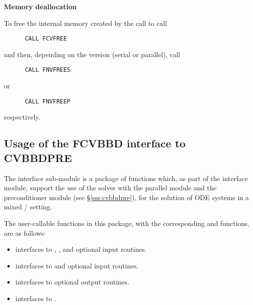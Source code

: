 \begin{Steps}
\item {\bf Memory deallocation}

  To free the internal memory created by the call to  call
\begin{verbatim}
      CALL FCVFREE
\end{verbatim}
  and then, depending on the {\nvector} version (serial or parallel), call
\begin{verbatim}
      CALL FNVFREES
\end{verbatim}
  or
\begin{verbatim}
      CALL FNVFREEP  
\end{verbatim}
  respectively.

\end{Steps}

\subsection{Usage of the FCVBBD interface to CVBBDPRE}

The {\fcvbbd} interface sub-module is a package of {\C} functions which,
as part of the {\fcvode} interface module, support the use of the
{\cvode} solver with the parallel {\nvecp} module and the {\cvbbdpre} 
preconditioner module (see \S\ref{sss:cvbbdpre}), for the solution of 
ODE systems in a mixed {\F}/{\C} setting.  

The user-callable functions in this package, with the corresponding
{\cvode} and {\cvbbdpre} functions, are as follows: 
\begin{itemize}
\item {}
  interfaces to , ,
  and {\spgmr} optional input routines.
\item {}
  interfaces to  and {\spgmr} optional input routines.
\item {}
  interfaces to {\cvbbdpre} optional output routines.
\item {}
  interfaces to .
\end{itemize}


